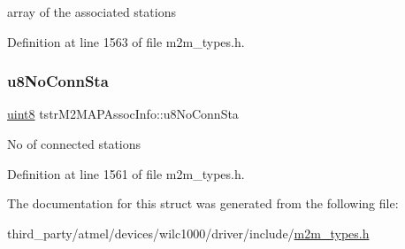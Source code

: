 array of the associated stations 

Definition at line 1563 of file m2m\+\_\+types.\+h.

\mbox{\label{structtstrM2MAPAssocInfo_a0529468d2d892e2549ba363186ec5c18}} 
\subsubsection{\texorpdfstring{u8\+No\+Conn\+Sta}{u8NoConnSta}}
{\footnotesize\ttfamily \hyperlink{group__DataT_ga4df709a77647e870bbf1d955b8edc9a6}{uint8} tstr\+M2\+M\+A\+P\+Assoc\+Info\+::u8\+No\+Conn\+Sta}

No of connected stations 

Definition at line 1561 of file m2m\+\_\+types.\+h.



The documentation for this struct was generated from the following file\+:\begin{DoxyCompactItemize}
\item 
third\+\_\+party/atmel/devices/wilc1000/driver/include/\hyperlink{m2m__types_8h}{m2m\+\_\+types.\+h}\end{DoxyCompactItemize}
